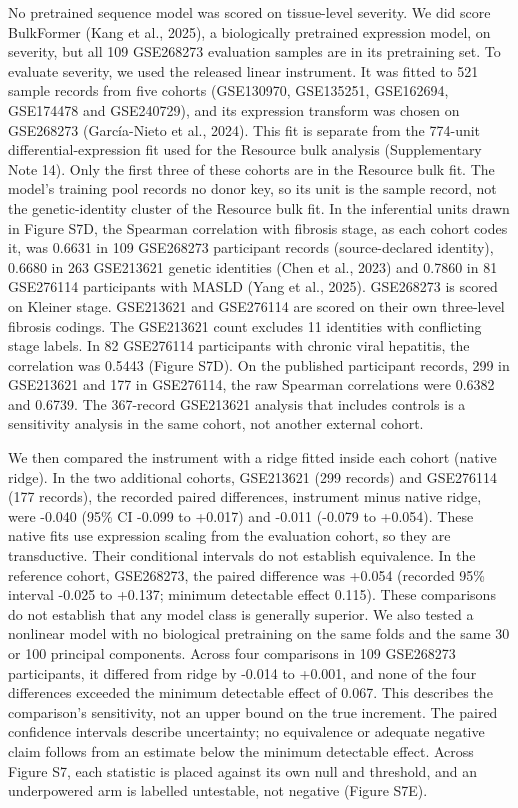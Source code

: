 No pretrained sequence model was scored on tissue-level severity. We did score
BulkFormer (Kang et al., 2025), a biologically pretrained expression
model, on severity, but all 109 GSE268273 evaluation samples are in its
pretraining set. To evaluate severity, we used the released linear instrument.
It was fitted to 521 sample records from five cohorts (GSE130970, GSE135251,
GSE162694, GSE174478 and GSE240729), and its expression
transform was chosen on GSE268273 (García-Nieto et al., 2024). This fit is
separate from the 774-unit differential-expression fit used for the Resource
bulk analysis (Supplementary Note 14). Only the first three of these cohorts are
in the Resource bulk fit. The model's training pool records no donor key, so
its unit is the sample record, not the genetic-identity cluster of the Resource
bulk fit. In the inferential units drawn in Figure
S7D, the Spearman correlation with fibrosis stage, as each cohort codes it, was
0.6631 in 109 GSE268273 participant records (source-declared identity), 0.6680 in 263
GSE213621 genetic identities (Chen et al., 2023) and 0.7860 in 81
GSE276114 participants with MASLD (Yang et al., 2025). GSE268273 is
scored on Kleiner stage. GSE213621 and GSE276114 are scored on their own
three-level fibrosis codings. The GSE213621
count excludes 11 identities with conflicting stage labels. In 82 GSE276114
participants with chronic viral hepatitis, the correlation was 0.5443 (Figure
S7D). On the published participant records, 299 in GSE213621 and 177 in
GSE276114, the raw Spearman correlations were 0.6382 and 0.6739. The 367-record
GSE213621 analysis that includes controls is a sensitivity analysis in the same
cohort, not another external cohort.

We then compared the instrument with a ridge fitted inside each cohort (native
ridge). In the two additional cohorts, GSE213621 (299 records) and GSE276114
(177 records), the recorded paired differences, instrument minus native ridge,
were -0.040 (95\% CI -0.099 to +0.017) and -0.011 (-0.079 to +0.054). These
native fits use expression scaling from the evaluation cohort, so they are
transductive. Their conditional intervals do not establish equivalence. In the
reference cohort, GSE268273, the paired difference was +0.054 (recorded 95\%
interval -0.025 to +0.137; minimum detectable effect 0.115). These comparisons
do not establish that any model class is generally superior. We also tested a
nonlinear model with no biological pretraining on the same folds and the same
30 or 100 principal components. Across four comparisons in 109 GSE268273
participants, it differed from ridge by -0.014 to +0.001, and none of the four
differences exceeded the minimum detectable effect of 0.067. This describes
the comparison's sensitivity, not an upper bound on the true increment. The
paired confidence intervals describe uncertainty; no equivalence or adequate
negative claim follows from an estimate below the minimum detectable effect. Across Figure S7, each statistic is placed
against its own null and threshold, and an underpowered arm is labelled
untestable, not negative (Figure S7E).

